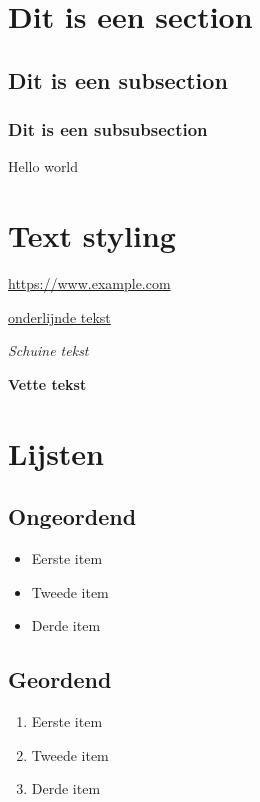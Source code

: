 \documentclass{article}
\begin{document}
\section{Dit is een section}

\subsection{Dit is een subsection}

\subsubsection{Dit is een subsubsection}

Hello world

\section{Text styling}

\url{https://www.example.com} %

\underline{onderlijnde tekst}

\textit{Schuine tekst}

\textbf{Vette tekst}

\section{Lijsten}

\subsection{Ongeordend}

\begin{itemize}
    \item Eerste item
    \item Tweede item
    \item Derde item
\end{itemize}

\subsection{Geordend}

\begin{enumerate}
    \item Eerste item
    \item Tweede item
    \item Derde item
\end{enumerate}
\end{document}
